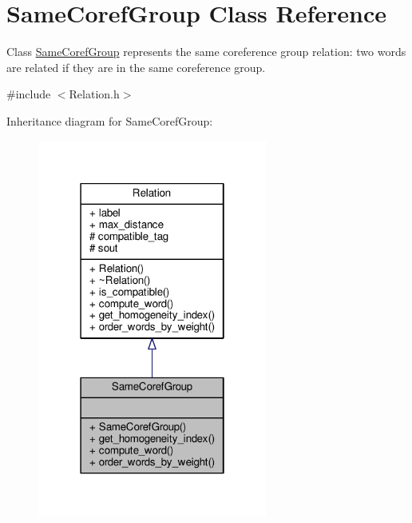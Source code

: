 \hypertarget{classSameCorefGroup}{}\section{Same\+Coref\+Group Class Reference}
\label{classSameCorefGroup}


Class \hyperlink{classSameCorefGroup}{Same\+Coref\+Group} represents the same coreference group relation\+: two words are related if they are in the same coreference group.  




{\ttfamily \#include $<$Relation.\+h$>$}



Inheritance diagram for Same\+Coref\+Group\+:
\nopagebreak
\begin{figure}[H]
\begin{center}
\leavevmode
\includegraphics[width=214pt]{classSameCorefGroup__inherit__graph}
\end{center}
\end{figure}


